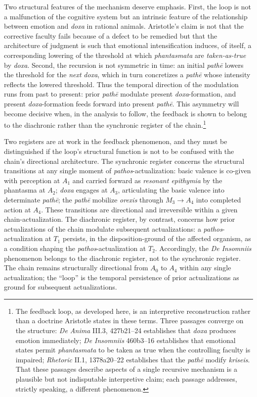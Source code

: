 \documentclass{article}
\begin{document}
Two structural features of the mechanism deserve emphasis. First, the loop is not a malfunction of the cognitive system but an intrinsic feature of the relationship between emotion and \textit{doxa} in rational animals. Aristotle's claim is not that the corrective faculty fails because of a defect to be remedied but that the architecture of judgment is such that emotional intensification induces, of itself, a corresponding lowering of the threshold at which \textit{phantasmata} are \textit{taken-as-true} by \textit{doxa}. Second, the recursion is not symmetric in time: an initial \textit{path\=e} lowers the threshold for the \textit{next} \textit{doxa}, which in turn concretizes a \textit{path\=e} whose intensity reflects the lowered threshold. Thus the temporal direction of the modulation runs from past to present: prior \textit{path\=e} modulate present \textit{doxa}-formation, and present \textit{doxa}-formation feeds forward into present \textit{path\=e}. This asymmetry will become decisive when, in the analysis to follow, the feedback is shown to belong to the diachronic rather than the synchronic register of the chain.\footnote{The feedback loop, as developed here, is an interpretive reconstruction rather than a doctrine Aristotle states in these terms. Three passages converge on the structure: \textit{De Anima} III.3, 427b21--24 establishes that \textit{doxa} produces emotion immediately; \textit{De Insomniis} 460b3--16 establishes that emotional states permit \textit{phantasmata} to be taken as true when the controlling faculty is impaired; \textit{Rhetoric} II.1, 1378a20--22 establishes that the \textit{path\=e} modify \textit{kriseis}. That these passages describe aspects of a single recursive mechanism is a plausible but not indisputable interpretive claim; each passage addresses, strictly speaking, a different phenomenon.}

Two registers are at work in the feedback phenomenon, and they must be distinguished if the loop's structural function is not to be confused with the chain's directional architecture. The synchronic register concerns the structural transitions at any single moment of \textit{pathos}-actualization: basic valence is co-given with perception at $A_1$ and carried forward as \textit{resonant epithymia} by the phantasma at $A_2$; \textit{doxa} engages at $A_3$, articulating the basic valence into determinate \textit{path\=e}; the \textit{path\=e} mobilize \textit{orexis} through $M_3 \rightarrow A_4$ into completed action at $A_4$. These transitions are directional and irreversible within a given chain-actualization. The diachronic register, by contrast, concerns how prior actualizations of the chain modulate subsequent actualizations: a \textit{pathos}-actualization at $T_1$ persists, in the disposition-ground of the affected organism, as a condition shaping the \textit{pathos}-actualization at $T_2$. Accordingly, the \textit{De Insomniis} phenomenon belongs to the diachronic register, not to the synchronic register. The chain remains structurally directional from $A_0$ to $A_4$ within any single actualization; the ``loop'' is the temporal persistence of prior actualizations as ground for subsequent actualizations.
\end{document}
